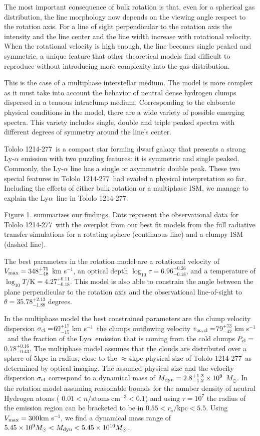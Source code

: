 \documentclass[a4paper, usenatbib, 12pt]{article}
\newcommand{\tol}{Tololo 1214-277}
\newcommand{\lya}{Ly$\alpha$}
\newcommand{\kms}{km s$^{-1}$}
\newcommand{\sigmaclump}{$69^{+17}_{-15}$ km s$^{-1}$}
\newcommand{\inftyclump}{$79^{+73}_{-42}$ km s$^{-1}$}
\newcommand{\probaclump}{$0.78^{+0.16}_{-0.43}$}
\begin{document}
{The most important consequence of bulk rotation is that, even for a
spherical gas distribution, the line morphology now depends on the
viewing angle respect to the rotation axis.  
For a line of sight perpendicular to the rotation axis the intensity
and the line center and the line width increase with rotational
velocity. 
When the rotational velocity is high enough, the line becomes single
peaked and symmetric, a unique feature that other theoretical models
find difficult to reproduce without introducing more complexity into
the gas distribution.  

This is the case of a multiphase interstellar medium.
The model is more complex as it must take into account the behavior
of neutral dense hydrogen clumps dispersed in a tenuous intraclump medium.  
Corresponding to the elaborate physical conditions in the model,
there are a wide variety of possible emerging spectra.
This variety includes single, double and triple peaked
spectra with different degrees of symmetry around the line's center.


\tol\ is a compact star forming dwarf galaxy that presents a
strong Ly-$\alpha$ emission \cite{Thuan97} with two puzzling 
features: it is symmetric and single peaked.
Commonly, the Ly-$\alpha$ line has a single or asymmetric double peak. 
These two special features in \tol\ had evaded a physical
interpretation so far. 
Including the effects of either bulk rotation or a multiphase ISM, we
manage to explain the \lya\ line in \tol.  

Figure 1. summarizes our findings.
Dots represent the observational data for \tol\ with the
overplot from our best fit models from the full radiative transfer
simulations for a rotating sphere (continuous line) and a clumpy ISM
(dashed line).

The best parameters in the rotation model are a rotational velocity of 
$V_{\rm max}=348^{+75}_{-48}$ \kms, an optical depth
$\log_{10}\tau=6.96^{+0.26}_{-0.18}$,  and a temperature of $\log_{10}
T/\mathrm {K} = 4.27^{+0.11}_{-0.18}$.  
This model is also able to constrain the angle between the plane
perpendicular to the rotation axis and the observational line-of-sight
to $\theta = 35.78^{+2.13}_{-1.88}$ degrees.

In the multiphase model the best constrained parameters are
the clump velocity dispersion  $\sigma_{\rm{cl}}=$\sigmaclump\
the clumps outflowing velocity $v_{\infty, \rm{cl}}=$\inftyclump\
and the fraction of the \lya\ emission that is  coming
from the cold clumps  $P_{\rm cl}=$\probaclump.
The multiphase model assumes that the clouds are distributed over a
sphere of $5$kpc in radius, close to the $\approx 4$kpc physical size
of \tol\ as determined by optical imaging.
The assumed physical size and the velocity dispersion $\sigma_{\rm
  cl}$ correspond to a  dynamical mass of  $M_{\rm
  dyn}=2.8^{+1.3}_{-1.2}\times 10^{9}$ $M_{\odot}$. In the rotation
model assuming reasonable bounds for the number density of neutral Hydrogen atoms (
$0.01<n/\mathrm{atoms\ cm^{-3}}<0.1$) and using $\tau=10^7$ the radius
of the emission region can be bracketed to be in $0.55 <
r_s/\mathrm{kpc}< 5.5$.
Using $V_{\rm max}=300$km s$^{-1}$, we find a dynamical mass range of
$5.45\times 10^{9}M_{\odot} < M_{\rm dyn} < 5.45\times 10^{10} M_{\odot}$.  

}
\end{document}
